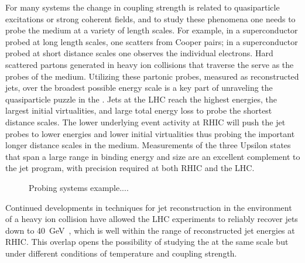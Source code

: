 For many systems the change in coupling strength is related to
quasiparticle excitations or strong coherent fields, and to study
these phenomena one needs to probe the medium at a variety of length
scales.  For example, in a superconductor probed at long length
scales, one scatters from Cooper pairs; in a superconductor probed at
short distance scales one observes the individual electrons.  Hard
scattered partons generated in heavy ion collisions that traverse the
\qgp serve as the probes of the medium.  Utilizing these partonic
probes, measured as reconstructed jets, over the broadest possible
energy scale is a key part of unraveling the quasiparticle puzzle in
the \qgp.  Jets at the LHC reach the highest energies, the largest initial
virtualities, and large total energy loss to probe the shortest distance scales. The lower
underlying event activity at RHIC will push the jet probes to lower energies and lower
initial virtualities thus probing the important longer distance scales in the medium.
Measurements of the three Upsilon states that span a large range in binding energy 
and size are an excellent complement to the jet program, with precision required at 
both RHIC and the LHC.

\begin{figure}[!hbt]
 \begin{center}
    \caption[Probing Systems]{Probing systems example....
    \label{fig:sidebar1}}
 \end{center}
\end{figure}

Continued developments in techniques for jet reconstruction in the
environment of a heavy ion collision have allowed the LHC experiments
to reliably recover jets down to
40~GeV~\cite{Aad:2013sla,Aad:2012vca}, which is well within the range
of reconstructed jet energies at RHIC.  This overlap opens the
possibility of studying the \qgp at the same scale but under different
conditions of temperature and coupling strength.

